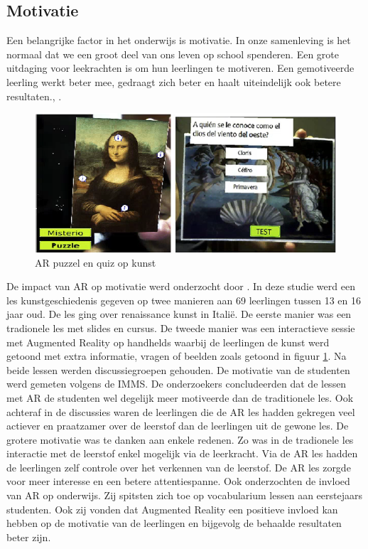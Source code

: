 \documentclass[pdftex,a4paper,12pt,twoside]{report}
\begin{document}

\subsection{Motivatie}
Een belangrijke factor in het onderwijs is motivatie. In onze samenleving is het normaal dat we een groot deel van ons leven op school spenderen. Een grote uitdaging voor leekrachten is om hun leerlingen te motiveren. Een gemotiveerde leerling werkt beter mee, gedraagt zich beter en haalt uiteindelijk ook betere resultaten.\citep{deci1991motivation}, \citep{theall1999have}.\\

\begin{figure}[h]
\begin{center}
\includegraphics[scale=0.5]{kunst.png}
\caption{AR puzzel en quiz op kunst \citep{di2013impact}}\label{fig:kunst}
\end{center}
\end{figure}


De impact van AR op motivatie werd onderzocht door \cite{di2013impact}. In deze studie werd een les kunstgeschiedenis gegeven op twee manieren aan 69 leerlingen tussen 13 en 16 jaar oud. De les ging over renaissance kunst in Itali\"e.  De eerste manier was een tradionele les met slides en cursus. De tweede manier was een interactieve sessie met Augmented Reality op handhelds waarbij de leerlingen de kunst werd getoond met extra informatie, vragen of beelden zoals getoond in figuur \ref{fig:kunst}. Na beide lessen werden discussiegroepen gehouden. De motivatie van de studenten werd gemeten volgens de IMMS. De onderzoekers concludeerden dat de lessen met AR de studenten wel degelijk meer motiveerde dan de traditionele les. Ook achteraf in de discussies waren de leerlingen die de AR les hadden gekregen veel actiever en praatzamer over de leerstof dan de leerlingen uit de gewone les. De grotere motivatie was te danken aan enkele redenen. Zo was in de tradionele les interactie met de leerstof enkel mogelijk via de leerkracht. Via de AR les hadden de leerlingen zelf controle over het verkennen van de leerstof. De AR les zorgde voor meer interesse en een betere attentiespanne. Ook \cite{solak2015exploring} onderzochten de invloed van AR op onderwijs. Zij spitsten zich toe op vocabularium lessen aan eerstejaars studenten. Ook zij vonden dat Augmented Reality een positieve invloed kan hebben op de motivatie van de leerlingen en bijgevolg de behaalde resultaten beter zijn.
	
\end{document}
